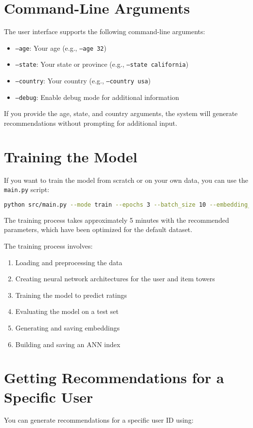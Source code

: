 \documentclass[12pt, a4paper, oneside]{book}
\begin{document}
\section{Command-Line Arguments}
The user interface supports the following command-line arguments:

\begin{itemize}
    \item \texttt{--age}: Your age (e.g., \texttt{--age 32})
    \item \texttt{--state}: Your state or province (e.g., \texttt{--state california})
    \item \texttt{--country}: Your country (e.g., \texttt{--country usa})
    \item \texttt{--debug}: Enable debug mode for additional information
\end{itemize}

If you provide the age, state, and country arguments, the system will generate recommendations without prompting for additional input.

\section{Training the Model}
If you want to train the model from scratch or on your own data, you can use the \texttt{main.py} script:

\begin{lstlisting}[language=bash]
python src/main.py --mode train --epochs 3 --batch_size 10 --embedding_dim 32
\end{lstlisting}

The training process takes approximately 5 minutes with the recommended parameters, which have been optimized for the default dataset.

The training process involves:
\begin{enumerate}
    \item Loading and preprocessing the data
    \item Creating neural network architectures for the user and item towers
    \item Training the model to predict ratings
    \item Evaluating the model on a test set
    \item Generating and saving embeddings
    \item Building and saving an ANN index
\end{enumerate}

\section{Getting Recommendations for a Specific User}
You can generate recommendations for a specific user ID using:
\end{document}
